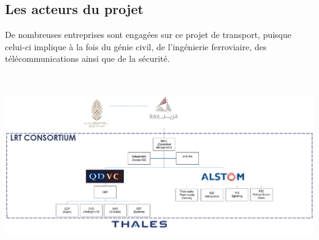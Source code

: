 \subsection{Les acteurs du projet}
De nombreuses entreprises sont engagées sur ce projet de transport, puisque celui-ci implique à la fois du génie civil, de l'ingénierie ferroviaire, des télécommunications ainsi que de la sécurité.
\begin{center}
\includegraphics[height=8cm]{ressources/images/figures/Consortium.png}
\end{center}

